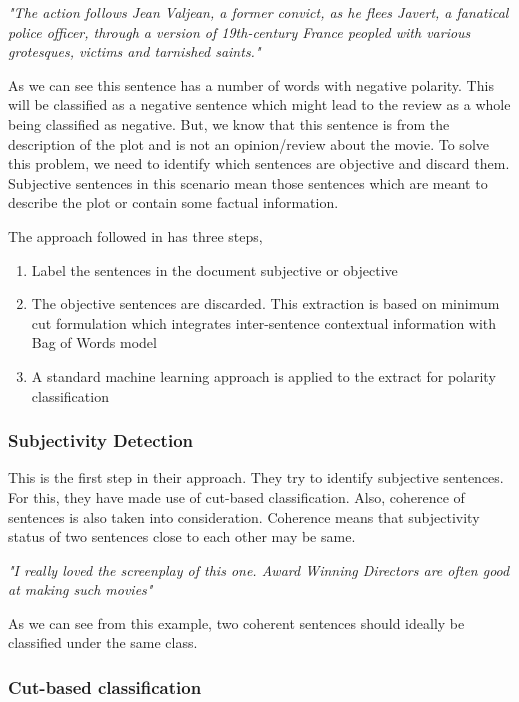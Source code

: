 \textit{"The action follows Jean Valjean, a former convict, as he flees Javert, a fanatical police officer, through
a version of 19th-century France peopled with various grotesques, victims and tarnished saints."}

As we can see this sentence has a number of words with negative polarity. This will be classified as a negative sentence which 
might lead to the review as a whole being classified as negative. But, we know that this sentence is from the description of the 
plot and is not an opinion/review about the movie. To solve this problem, we need to identify which sentences are objective and discard them.
Subjective sentences in this scenario mean those sentences which are meant to describe the plot or contain some factual information.

The approach followed in \citep*{pang2004sentimental} has three steps,

\begin{enumerate}
 \item 	Label the sentences in the document subjective or objective
 \item The objective sentences are discarded. This extraction is based on minimum cut formulation which integrates inter-sentence contextual
information with Bag of Words model
 \item A standard machine learning approach is applied to the extract for polarity classification
\end{enumerate}

\subsubsection*{Subjectivity Detection}

This is the first step in their approach. They try to identify subjective sentences. For this, they have made use of cut-based
classification. Also, coherence of sentences is also taken into consideration. Coherence means that subjectivity status of two 
sentences close to each other may be same.

\textit{"I really loved the screenplay of this one. Award Winning Directors are often good at making such movies"}

As we can see from this example, two coherent sentences should ideally be classified under the same class.

\subsubsection*{Cut-based classification}

